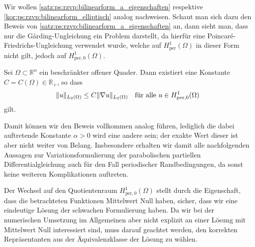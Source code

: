 Wir wollen \cref{satz:ps:rzvp:bilinearform_a_eigenschaften} respektive \cref{kor:ps:rzvp:bilinearform_elliptisch} analog nachweisen.
Schaut man sich dazu den Beweis von \cref{satz:ps:rzvp:bilinearform_a_eigenschaften} an, dann sieht man, dass nur die G\aa{}rding-Ungleichung ein Problem darstellt, da hierfür eine Poincaré-Friedrichs-Ungleichung verwendet wurde, welche auf $H^{1}_{\text{per}}(\Omega)$ in dieser Form nicht gilt, jedoch auf $H^{1}_{\text{per}, 0}(\Omega)$.

\begin{Lemma}
    Sei $\Omega \subset \mathbb{R}^{n}$ ein beschränkter offener Quader.
    Dann existiert eine Konstante $C = C(\Omega) \in \mathbb{R}_{+}$, so dass
    \begin{equation}
        \norm{u}_{L_{2}(\Omega)} \leq C \norm{\grad u}_{L_{2}(\Omega)} \quad \fa u \in H^{1}_{\text{per}, 0}(\Omega)
    \end{equation}
    gilt.
\end{Lemma}


Damit können wir den Beweis vollkommen analog führen, lediglich die dabei auftretende Konstante $\alpha > 0$ wird eine andere sein; der exakte Wert dieser ist aber nicht weiter von Belang.
Insbesondere erhalten wir damit alle nachfolgenden Aussagen zur Variationsformulierung der parabolischen partiellen Differentialgleichung auch für den Fall periodischer Randbedingungen, da sonst keine weiteren Komplikationen auftreten.

Der Wechsel auf den Quotientenraum $H^{1}_{\text{per}, 0}(\Omega)$ stellt durch die Eigenschaft, dass die betrachteten Funktionen Mittelwert Null haben, sicher, dass wir eine eindeutige Lösung der schwachen Formulierung haben.
Da wir bei der numerischen Umsetzung im Allgemeinen aber nicht explizit an einer Lösung mit Mittelwert Null interessiert sind, muss darauf geachtet werden, den korrekten Repräsentanten aus der Äquivalenzklasse der Lösung zu wählen.

